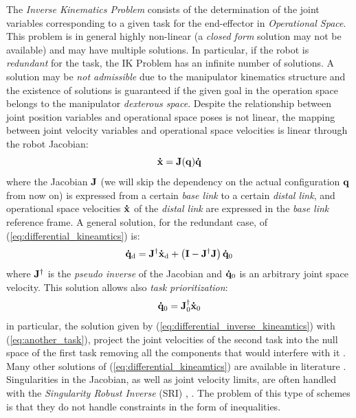 The \emph{Inverse Kinematics Problem} consists of the determination of the joint variables corresponding to a given task for the end-effector in \emph{Operational Space}. This problem is in general highly non-linear (a \emph{closed form} solution may not be available) and may have multiple solutions. In particular, if the robot is \emph{redundant} for the task, the IK Problem has an infinite number of solutions. A solution may be \emph{not admissible} due to the manipulator kinematics structure and the existence of solutions is guaranteed if the given goal in the operation space belongs to the manipulator \emph{dexterous space}.
Despite the relationship between joint position variables and operational space poses is not linear, the mapping between joint velocity variables and operational space velocities is linear through the robot Jacobian:
\begin{equation}
    \label{eq:differential_kineamtics}
    \mathbf{\dot{x}} = \mathbf{J}(\mathbf{q})\mathbf{\dot{q}}
\end{equation}
where the Jacobian $\mathbf{J}$ (we will skip the dependency on the actual configuration $\mathbf{q}$ from now on) is expressed from a certain \emph{base link} to a certain \emph{distal link}, and operational space velocities $\mathbf{\dot{x}}$ of the \emph{distal link} are expressed in the \emph{base link} reference frame.
A general solution, for the redundant case, of (\ref{eq:differential_kineamtics}) is:
\begin{equation}
    \label{eq:differential_inverse_kineamtics}
    \mathbf{\dot{q}}_\text{d} = \mathbf{J}^{\dagger}\mathbf{\dot{x}}_\text{d} + \left( \mathbf{I} - \mathbf{J}^{\dagger}\mathbf{J} \right)\mathbf{\dot{q}}_\text{0}
\end{equation}
where $\mathbf{J}^{\dagger}$ is the \emph{pseudo inverse} of the Jacobian and $\mathbf{\dot{q}}_\text{0}$ is an arbitrary joint space velocity. 
This solution allows also \emph{task prioritization}: 
\begin{equation}
    \label{eq:another_task}
\mathbf{\dot{q}}_\text{0} = \mathbf{J}_\text{0}^{\dagger}\mathbf{\dot{x}}_\text{0}
\end{equation}
in particular, the solution given by (\ref{eq:differential_inverse_kineamtics}) with (\ref{eq:another_task}), project the joint velocities of the second task into the null space of the first task removing all the components that would interfere with it \cite{DBLPReferenceRobo2008}. Many other solutions of (\ref{eq:differential_kineamtics}) are available in literature \cite{siciliano1991general}. Singularities in the Jacobian, as well as joint velocity limits, are often handled with the \emph{Singularity Robust Inverse} (SRI) \cite{nakamura1990-tp}, \cite{maciejewski1989-jp}.
The problem of this type of schemes is that they do not handle constraints in the form of inequalities. 

